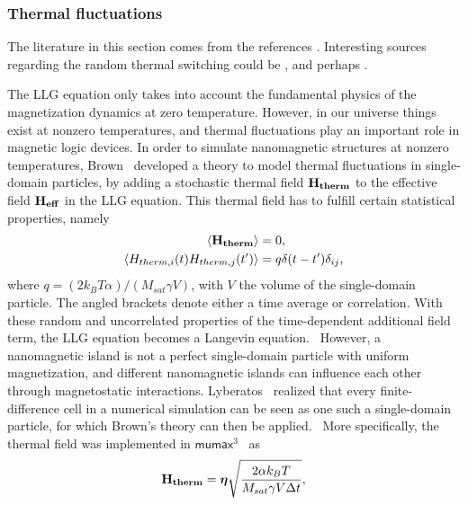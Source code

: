 \documentclass[11pt,a4paper,english]{article}
\renewcommand{\vec}[1]{\boldsymbol{#1}}
\newcommand{\mumax}{$\mathsf{mumax}^3$}
\begin{document}
\subsubsection{Thermal fluctuations}
The literature in this section comes from the references \cite{LEL-17b}. 
Interesting sources regarding the random thermal switching could be \cite{ThermFluc_SingleDomain, RandomSwitch_MonteCarlo, Nonmonotonic_reversal}, and perhaps \cite{MagDynamics_JumpNoise}. \par
The LLG equation only takes into account the fundamental physics of the magnetization dynamics at zero temperature. However, in our universe things exist at nonzero temperatures, and thermal fluctuations play an important role in magnetic logic devices. %
In order to simulate nanomagnetic structures at nonzero temperatures, Brown~\cite{ThermFluc_SingleDomain} developed a theory to model thermal fluctuations in single-domain particles, by adding a stochastic thermal field $\vb{H_{therm}}$ to the effective field $\vb{H_{eff}}$ in the LLG equation. This thermal field has to fulfill certain statistical properties, namely
\begin{align*}
    \langle \vb{H_{therm}} \rangle &= 0 \mathrm{,} \\
    \langle H_{therm,i}(t) H_{therm,j}(t') \rangle &= q \delta(t-t') \delta_{ij} \mathrm{,}
\end{align*}
where $q=(2 k_B T \alpha)/(M_{sat} \gamma V)$, with $V$ the volume of the single-domain particle. The angled brackets denote either a time average or correlation. With these random and uncorrelated properties of the time-dependent additional field term, the LLG equation becomes a Langevin equation.~\cite{ThermFluc_SingleDomain} However, a nanomagnetic island is not a perfect single-domain particle with uniform magnetization, and different nanomagnetic islands can influence each other through magnetostatic interactions.
Lyberatos~\cite{Lyberatos_1993} realized that every finite-difference cell in a numerical simulation can be seen as one such a single-domain particle, for which Brown's theory can then be applied.~\cite{phd_leliaert} More specifically, the thermal field was implemented in \mumax{}~\cite{LEL-17b,MuMax3} as
\begin{equation}
    \vb{H_{therm}} = \vec{\eta} \sqrt{\frac{2 \alpha k_B T}{M_{sat} \gamma V \Delta t}} \mathrm{,}
    \label{eq:H_therm}
\end{equation}
\end{document}

